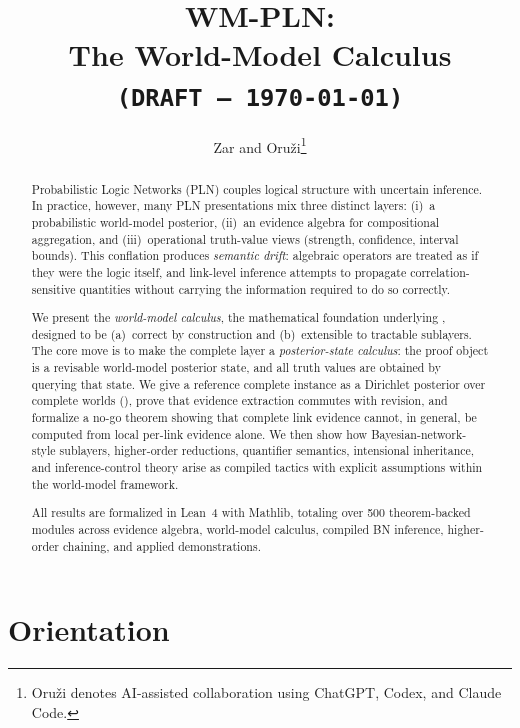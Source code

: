 \documentclass[11pt,openany]{report}
\title{WM-PLN:\\[4pt]
  The World-Model Calculus\\[12pt]
  \large\texttt{(DRAFT --- \today)}}
\author{Zar and Oru\v{z}i\thanks{%
  Oru\v{z}i denotes AI-assisted collaboration using ChatGPT, Codex, and Claude Code.}}
\date{}
\begin{document}
\maketitle

\begin{abstract}
Probabilistic Logic Networks (PLN) couples logical structure with uncertain
inference.  In practice, however, many PLN presentations mix three distinct
layers: (i)~a probabilistic world-model posterior, (ii)~an evidence algebra
for compositional aggregation, and (iii)~operational truth-value views
(strength, confidence, interval bounds).  This conflation produces
\emph{semantic drift}: algebraic operators are treated as if they were the
logic itself, and link-level inference attempts to propagate
correlation-sensitive quantities without carrying the information required to
do so correctly.

We present the \emph{world-model calculus}, the mathematical foundation
underlying \xiPLN{}, designed to be (a)~correct by construction and
(b)~extensible to tractable sublayers.  The core move is to make the
complete layer a \emph{posterior-state calculus}: the proof object is a
revisable world-model posterior state, and all truth values are obtained
by querying that state.  We give a reference complete
instance as a Dirichlet posterior over complete worlds (\JointEvidence{}),
prove that evidence extraction commutes with revision, and formalize a no-go
theorem showing that complete link evidence cannot, in general, be computed
from local per-link evidence alone.  We then show how Bayesian-network-style
sublayers, higher-order reductions, quantifier semantics, intensional
inheritance, and inference-control theory arise as compiled tactics with
explicit assumptions within the world-model framework.

All results are formalized in Lean~4 with Mathlib, totaling over 500
theorem-backed modules across evidence algebra, world-model calculus,
compiled BN inference, higher-order chaining, and applied
demonstrations.
\end{abstract}

\tableofcontents

\part{Orientation}
\label{part:orientation}
\end{document}
